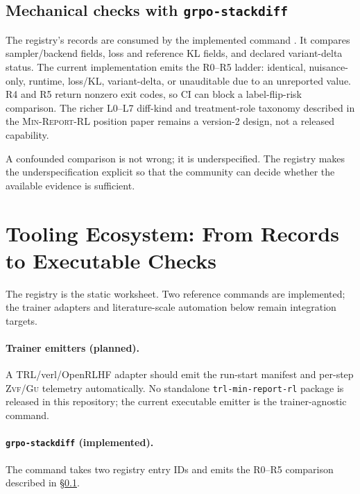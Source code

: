 \documentclass[11pt]{article}
\newcommand{\zvf}{\textsc{Zvf}}
\newcommand{\gu}{\textsc{Gu}}
\newcommand{\minreport}{\textsc{Min-Report-RL}}
\begin{document}
\subsection{Mechanical checks with \texttt{grpo-stackdiff}}
\label{sec:mechanical}

The registry's records are consumed by the implemented command
\cite{minreportrl2026}. It compares sampler/backend fields, loss and reference
KL fields, and declared variant-delta status. The current implementation emits
the R0--R5 ladder: identical, nuisance-only, runtime, loss/KL, variant-delta,
or unauditable due to an unreported value. R4 and R5 return nonzero exit codes,
so CI can block a label-flip-risk comparison. The richer L0--L7 diff-kind and
treatment-role taxonomy described in the \minreport{} position paper remains
a version-2 design, not a released capability.

A confounded comparison is not wrong; it is underspecified. The registry makes
the underspecification explicit so that the community can decide whether the
available evidence is sufficient.

\section{Tooling Ecosystem: From Records to Executable Checks}
\label{sec:tools}

The registry is the static worksheet. Two reference commands are implemented;
the trainer adapters and literature-scale automation below remain integration
targets.

\paragraph{Trainer emitters (planned).} A TRL/verl/OpenRLHF adapter should emit
the run-start manifest and per-step \zvf{}/\gu{} telemetry automatically. No
standalone \texttt{trl-min-report-rl} package is released in this repository;
the current executable emitter is the trainer-agnostic
 command.

\paragraph{\texttt{grpo-stackdiff} (implemented).} The
 command takes two registry entry IDs and
emits the R0--R5 comparison described in \S\ref{sec:mechanical}.
\end{document}
